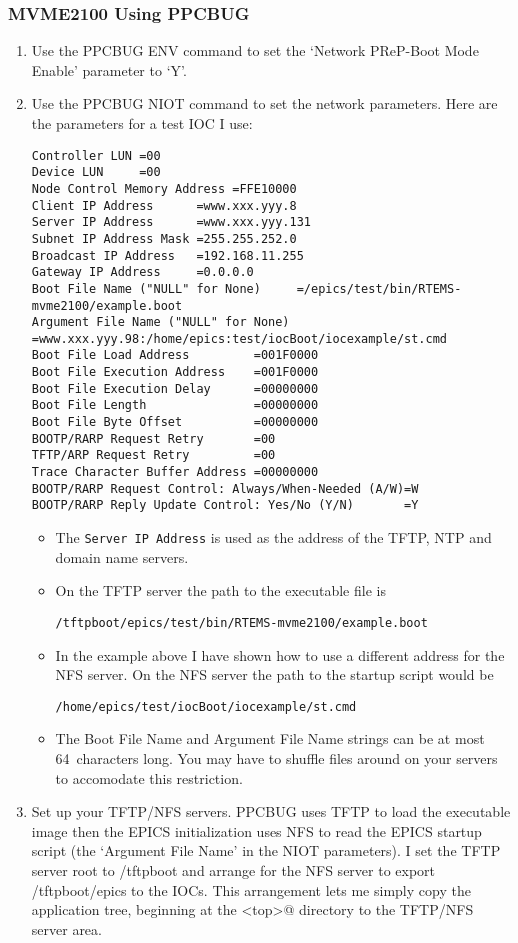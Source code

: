 \documentclass{report}
\begin{document}
\subsubsection{MVME2100 Using PPCBUG}
\begin{enumerate}
\item Use the PPCBUG ENV command to set the `Network PReP-Boot Mode Enable'
parameter to `Y'.
\item Use the PPCBUG NIOT command to set the network parameters.  Here are the
parameters for a test IOC I use:
\begin{footnotesize}
\begin{verbatim}
Controller LUN =00
Device LUN     =00
Node Control Memory Address =FFE10000
Client IP Address      =www.xxx.yyy.8
Server IP Address      =www.xxx.yyy.131
Subnet IP Address Mask =255.255.252.0
Broadcast IP Address   =192.168.11.255
Gateway IP Address     =0.0.0.0
Boot File Name ("NULL" for None)     =/epics/test/bin/RTEMS-mvme2100/example.boot
Argument File Name ("NULL" for None) =www.xxx.yyy.98:/home/epics:test/iocBoot/iocexample/st.cmd
Boot File Load Address         =001F0000
Boot File Execution Address    =001F0000
Boot File Execution Delay      =00000000
Boot File Length               =00000000
Boot File Byte Offset          =00000000
BOOTP/RARP Request Retry       =00
TFTP/ARP Request Retry         =00
Trace Character Buffer Address =00000000
BOOTP/RARP Request Control: Always/When-Needed (A/W)=W
BOOTP/RARP Reply Update Control: Yes/No (Y/N)       =Y
\end{verbatim}
\end{footnotesize}

\begin{itemize}
\item The {\tt Server IP Address} is used as the address of the TFTP, NTP and domain name servers.
\item On the TFTP server the path to the executable file is
\begin{verbatim}
/tftpboot/epics/test/bin/RTEMS-mvme2100/example.boot
\end{verbatim}
\item In the example above I have shown how to use a different address for the NFS server.  On the NFS server the path to the startup script would  be
\begin{verbatim}
/home/epics/test/iocBoot/iocexample/st.cmd
\end{verbatim}
\item The Boot File Name and Argument File Name strings can be at most 64~characters long.  You may have to shuffle files around on your servers to accomodate this restriction.
\end{itemize}
\item Set up your TFTP/NFS servers.  PPCBUG uses TFTP
to load the executable image then the EPICS initialization uses
NFS to read the EPICS startup script (the `Argument File Name' in the NIOT
parameters).
I set the TFTP server root to /tftpboot and arrange for the NFS server to
export /tftpboot/epics to the IOCs.  This arrangement lets me simply copy the
application tree, beginning at the \verb@<top>@ directory to the TFTP/NFS server area.
\end{enumerate}
\end{document}
